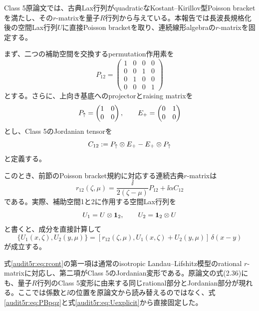 Class 5原論文では、古典Lax行列がquadraticなKostant--Kirillov型Poisson bracketを満たし、その$r$-matrixを量子$R$行列から与えている\cite{DFN}。本報告では長波長規格化後の空間Lax行列$U$に直接Poisson bracketを取り、連続線形algebraの$r$-matrixを固定する。

まず、二つの補助空間を交換するpermutation作用素を
\begin{equation}
P_{12}=
\begin{pmatrix}
1&0&0&0\\
0&0&1&0\\
0&1&0&0\\
0&0&0&1
\end{pmatrix}
\end{equation}
とする。さらに、上向き基底へのprojectorとraising matrixを
\begin{equation}
P_{\uparrow}=\begin{pmatrix}1&0\\0&0\end{pmatrix},
\qquad
E_{+}=\begin{pmatrix}0&1\\0&0\end{pmatrix}
\end{equation}
とし、Class 5のJordanian tensorを
\begin{equation}
C_{12}:=P_{\uparrow}\otimes E_{+}-E_{+}\otimes P_{\uparrow}
\label{audit5r:eq:Cj}
\end{equation}
と定義する。

このとき、前節のPoisson bracket規約に対応する連続古典$r$-matrixは
\begin{equation}
r_{12}(\zeta,\mu)
=
\frac{\ii}{2(\zeta-\mu)}P_{12}
+\ii\alpha C_{12}
\label{audit5r:eq:rcont}
\end{equation}
である。実際、補助空間1と2に作用する空間Lax行列を
\[
U_1=U\otimes\mathbf 1_2,
\qquad
U_2=\mathbf 1_2\otimes U
\]
と書くと、成分を直接計算して
\begin{equation}
\{U_1(x,\zeta),U_2(y,\mu)\}
=
[r_{12}(\zeta,\mu),U_1(x,\zeta)+U_2(y,\mu)]\,\delta(x-y)
\label{audit5r:eq:linearPB}
\end{equation}
が成立する。

式\eqref{audit5r:eq:rcont}の第一項は通常のisotropic Landau--Lifshitz模型のrational $r$-matrixに対応し、第二項がClass 5のJordanian変形である。原論文の式(2.36)にも、量子$R$行列のClass 5変形に由来する同じrational部分とJordanian部分が現れる\cite{DFN}。ここでは係数と$\ii$の位置を原論文から読み替えるのではなく、式\eqref{audit5r:eq:PBpqz}と式\eqref{audit5r:eq:Uexplicit}から直接固定した。

